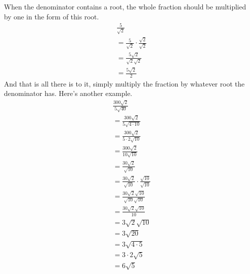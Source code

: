 When the denominator contains a root, the whole fraction should be multiplied by one in the form of this root.
\begin{align*}
	&\frac{5}{\sqrt{2}}\\
	&=\frac{5}{\sqrt{2}} \cdot \frac{\sqrt{2}}{\sqrt{2}}\\
	&=\frac{5\sqrt{2}}{\sqrt{2}\sqrt{2}}\\
	&=\frac{5\sqrt{2}}{2}
\end{align*}
And that is all there is to it, simply multiply the fraction by whatever root the denominator has. Here's another example.
\begin{align*}
	&\frac{300\sqrt{2}}{5\sqrt{40}}\\[5pt]
	&=\frac{300\sqrt{2}}{5\sqrt{4 \cdot 10}}\\[5pt]
	&=\frac{300\sqrt{2}}{5 \cdot 2\sqrt{10}}\\[5pt]
	&=\frac{300\sqrt{2}}{10\sqrt{10}}\\[5pt]
	&=\frac{30\sqrt{2}}{\sqrt{10}}\\[5pt]
	&=\frac{30\sqrt{2}}{\sqrt{10}} \cdot \frac{\sqrt{10}}{\sqrt{10}}\\[5pt]
	&=\frac{30\sqrt{2}\sqrt{10}}{\sqrt{10}\sqrt{10}}\\[5pt]
	&=\frac{30\sqrt{2}\sqrt{10}}{10}\\[5pt]
	&=3\sqrt{2}\sqrt{10}\\
	&=3\sqrt{20}\\
	&=3\sqrt{4 \cdot 5}\\
	&=3 \cdot 2 \sqrt{5}\\
	&=6\sqrt{5}
\end{align*}
